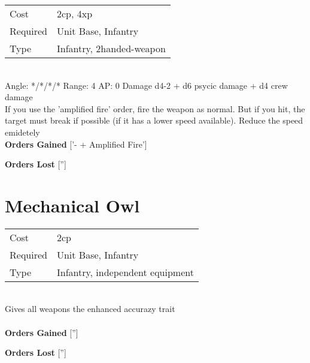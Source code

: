 \begin{tabular}{ll}
    Cost & 2cp, 4xp \\
    Required & Unit Base, Infantry\\
    Type & Infantry, 2handed-weapon\\
\end{tabular}
\ \\
\indent Angle: */*/*/* Range: 4  AP: 0 Damage d4-2 + d6 psycic damage + d4 crew damage \\
If you use the 'amplified fire' order, fire the weapon as normal. But if you hit, the target must break if possible (if it has a lower speed available). Reduce the speed emidetely
\ \\

{\bf Orders Gained}
['- + Amplified Fire']

{\bf Orders Lost}
['']
\section{ Mechanical Owl }

\begin{tabular}{ll}
    Cost & 2cp \\
    Required & Unit Base, Infantry\\
    Type & Infantry, independent equipment\\
\end{tabular}
\ \\
Gives all weapons the enhanced accurazy trait \\

\ \\

{\bf Orders Gained}
['']

{\bf Orders Lost}
['']
